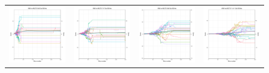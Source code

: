 \begin{figure}
\centering
\begin{tabular}{cccc}
\hspace{-0.5cm}\includegraphics[width = 1.55in]{images/Visualizations/ANNvsMCTS/500ms5x5.png} &
\hspace{-0.5cm}\includegraphics[width = 1.55in]{images/Visualizations/ANNvsMCTS/500ms7x7.png} &
\hspace{-0.5cm}\includegraphics[width = 1.55in]{images/Visualizations/ANNvsMCTS/500ms9x9.png} &
\hspace{-0.5cm}\includegraphics[width = 1.55in]{images/Visualizations/ANNvsMCTS/500ms11x11.png} \\


\end{tabular}
\end{figure}
